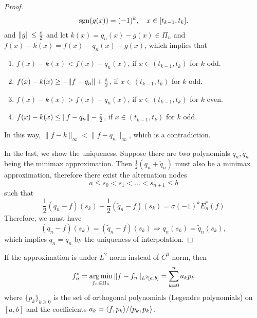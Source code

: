 \begin{proof}
\begin{eqnarray}
        \operatorname{sgn}(g(x)) = (-1)^k,\quad x\in[t_{k-1}, t_k].
    \end{eqnarray}
    and $\|g\|\le \frac{\varepsilon}{2}$ and let $k(x) = q_n(x) - g(x)\in \Pi_{n}$ and $f(x) - k(x) = f(x)-q_n(x) + g(x)$, which implies that 
    \begin{enumerate}
        \item $f(x) - k(x) < f(x) - q_n(x)$, if $x\in (t_{k-1}, t_k)$ for $k$ odd.
        \item $f(x) - k(x)\ge - \|f - q_n\| + \frac{\varepsilon}{2}$, if $x\in (t_{k-1}, t_k)$ for $k$ odd.
        \item $f(x) - k(x) > f(x) - q_n(x)$, if $x\in (t_{k-1}, t_k)$ for $k$ even.
        \item $f(x) - k(x)\le \|f - q_n\| -\frac{\varepsilon}{2}$, if $x\in (t_{k-1}, t_k)$ for $k$ odd.
    \end{enumerate}
    In this way, $\|f - k\|_{\infty} < \|f - q_n\|_{\infty}$, which is a contradiction.

    In the last, we show the uniqueness. Suppose there are two polynomials $q_n, \tilde{q}_n$ being the minimax approximation. Then $\frac{1}{2}(q_n +\tilde{q}_n)$ must also be a minimax approximation, therefore there exist the alternation nodes 
    \begin{equation}
        a\le s_0 < s_1 <\dots < s_{n+1} \le b
    \end{equation}
    such that 
    \begin{equation}
        \frac{1}{2}(q_n - f)(s_k) + \frac{1}{2}(\tilde{q}_n - f)(s_k) = \sigma (-1)^k E_n^{\ast}(f)
    \end{equation}
    Therefore, we must have 
    \begin{equation}
        (q_n - f)(s_k) = (\tilde{q}_n - f)(s_k)\Rightarrow q_n(s_k) = \tilde{q}_n(s_k),
    \end{equation}
    which implies $q_n = \tilde{q}_n$ by the uniqueness of interpolation. 
\end{proof}

\begin{remark}
    If the approximation is under $L^{2}$ norm instead of $C^0$ norm, then  
    \begin{equation}
        f_n^{\ast} = \operatorname*{\arg\min}_{f_n \in \Pi_n }\|f - f_n\|_{L^2[a, b]} = \sum_{k=0}^{n} a_k p_k
    \end{equation}
    where $\{p_k\}_{k\ge 0}$ is the set of orthogonal polynomials (Legendre polynomials) on $[a, b]$ and the coefficients $a_k = \langle {f, p_k} \rangle/\langle {p_k, p_k} \rangle$. 
\end{remark}

